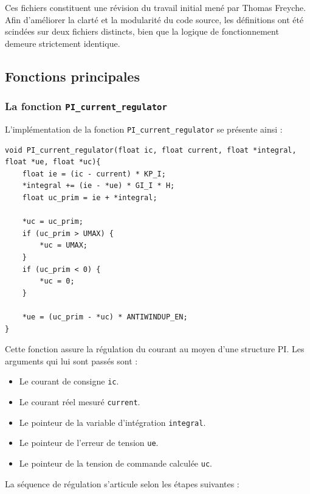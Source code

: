Ces fichiers constituent une révision du travail initial mené par Thomas Freyche. Afin d'améliorer la clarté et la modularité du code source, les définitions ont été scindées sur deux fichiers distincts, bien que la logique de fonctionnement demeure strictement identique.

\subsection{Fonctions principales}

\subsubsection{La fonction \texttt{PI\_current\_regulator}}
L'implémentation de la fonction \texttt{PI\_current\_regulator} se présente ainsi :

\begin{verbatim}
void PI_current_regulator(float ic, float current, float *integral,
float *ue, float *uc){
    float ie = (ic - current) * KP_I;
    *integral += (ie - *ue) * GI_I * H;
    float uc_prim = ie + *integral;

    *uc = uc_prim;
    if (uc_prim > UMAX) {
        *uc = UMAX;
    }
    if (uc_prim < 0) {
        *uc = 0;
    }

    *ue = (uc_prim - *uc) * ANTIWINDUP_EN;
}
\end{verbatim}

Cette fonction assure la régulation du courant au moyen d'une structure PI. Les arguments qui lui sont passés sont :

\begin{itemize}
    \item Le courant de consigne \texttt{ic}.
    \item Le courant réel mesuré \texttt{current}.
    \item Le pointeur de la variable d'intégration \texttt{integral}.
    \item Le pointeur de l'erreur de tension \texttt{ue}.
    \item Le pointeur de la tension de commande calculée \texttt{uc}.
\end{itemize}

La séquence de régulation s'articule selon les étapes suivantes :

